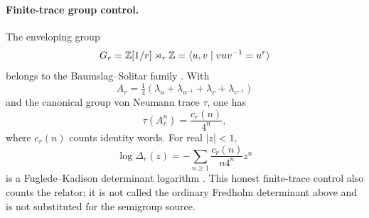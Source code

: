 \paragraph{Finite-trace group control.}
The enveloping group
\[
G_r=\mathbb Z[1/r]\rtimes_r\mathbb Z
=\langle u,v\mid vuv^{-1}=u^r\rangle
\]
belongs to the Baumslag--Solitar family \citep{BaumslagSolitar1962}.  With
\[
A_r=\tfrac14(\lambda_u+\lambda_{u^{-1}}+
\lambda_v+\lambda_{v^{-1}})
\]
and the canonical group von Neumann trace $\tau$, one has
\begin{equation}
\tau(A_r^n)=\frac{c_r(n)}{4^n},
\label{eq:group-count}
\end{equation}
where $c_r(n)$ counts identity words.  For real $|z|<1$,
\begin{equation}
\log\Delta_r(z)
=-\sum_{n\ge1}\frac{c_r(n)}{n4^n}z^n
\label{eq:FK-log}
\end{equation}
is a Fuglede--Kadison determinant logarithm
\citep{FugledeKadison1952}.  This honest finite-trace control also counts the
relator; it is not called the ordinary Fredholm determinant above and is not
substituted for the semigroup source.
